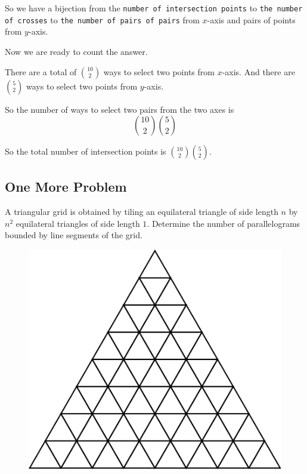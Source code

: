 \documentclass[compress]{beamer}
\begin{document}
\begin{frame}
    So we have a bijection from the \texttt{number of intersection points} to
    \texttt{the number of crosses} to \texttt{the number of pairs of pairs} from 
    \textcolor{NordRed}{$x$-axis and pairs of points from $y$-axis}.

    \pause\vspace{2em}

    Now we are ready to count the answer. 

    \pause\vspace{2em}

    \textcolor{NordRed}{
        There are a total of ${10 \choose 2}$ ways to select two points from
        $x$-axis. And there are ${5 \choose 2}$ ways to select two points from
        $y$-axis.
    }

    \pause\vspace{1em}

    So the number of ways to select two pairs from the two axes is 
    \[\boxed{{10 \choose 2}{5 \choose 2}}\] 
\end{frame}

\begin{frame}
    So the total number of intersection points is ${10 \choose 2}{5 \choose
    2}$.
\end{frame}


\subsection{One More Problem}

\begin{frame}
    \textcolor{NordOrange}{
        A triangular grid is obtained by tiling
        an equilateral triangle of side length $n$ by $n^{2}$ equilateral
        triangles of side length $1 .$ Determine the number of parallelograms
        bounded by line segments of the grid.
    }

    \begin{figure}
        \begin{center}
            \includegraphics[width=.4\linewidth]{trig_grid_1.pdf}
        \end{center}
    \end{figure}
\end{frame}
\end{document}
